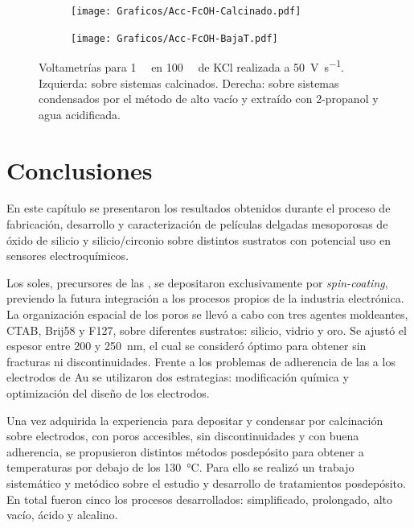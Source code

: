       		\begin{figure}[ht!]
		 	\begin{subfigure}[t]{0.5\textwidth}
		          	\texttt{[image: Graficos/Acc-FcOH-Calcinado.pdf]}
		          	\end{subfigure}
		    \begin{subfigure}[t]{0.5\textwidth}
		          	\texttt{[image: Graficos/Acc-FcOH-BajaT.pdf]}
		         	\end{subfigure}
		         	\caption[Voltagrama comparativo SF calcinados/alto vacío II]{Voltametrías para \fc\space \SI{1}{\milli\Molar} en \SI{100}{\milli\Molar} de KCl realizada a \SI{50}{\volt\per\second}. Izquierda: sobre sistemas \pdmF\space calcinados. Derecha: sobre sistemas \pdmF\space condensados por el método de alto vacío y extraído con 2-propanol y agua acidificada.}
		         	\label{fig:fcOH_accesibilidad}
		    \end{figure}     	

\pagebreak\section{Conclusiones}
	
	En este capítulo se presentaron los resultados obtenidos durante el proceso de fabricación, desarrollo y caracterización de películas delgadas mesoporosas de óxido de silicio y silicio/circonio sobre distintos sustratos con potencial uso en sensores electroquímicos.
	
	Los soles, precursores de las \pdm, se depositaron exclusivamente por \textit{spin-coating}, previendo la futura integración a los procesos propios de la industria electrónica. La organización espacial de los poros se llevó a cabo con tres agentes moldeantes, CTAB, Brij58 y F127, sobre diferentes sustratos: silicio, vidrio y oro. Se ajustó el espesor entre 200 y \SI{250}{\nm}, el cual se consideró óptimo para obtener \pdm\space sin fracturas ni discontinuidades. Frente a los problemas de adherencia de las \pdm\space a los electrodos de Au se utilizaron dos estrategias: modificación química y optimización del diseño de los electrodos. 

	Una vez adquirida la experiencia para depositar y condensar por calcinación \pdm\space sobre electrodos, con poros accesibles, sin discontinuidades y con buena adherencia, se propusieron distintos métodos posdepósito para obtener \pdm\space a temperaturas por debajo de los \SI{130}{\celsius}. Para ello se realizó un trabajo sistemático y metódico sobre el estudio y desarrollo de tratamientos posdepósito. En total fueron cinco los procesos desarrollados: simplificado, prolongado, alto vacío, ácido y alcalino.

